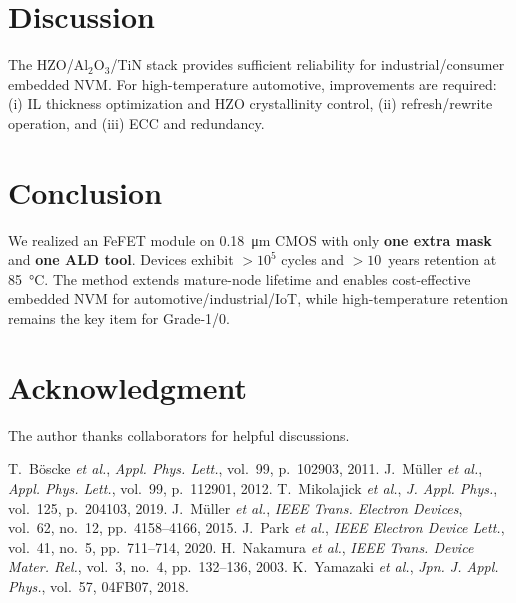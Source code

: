 \documentclass[conference]{IEEEtran}
\begin{document}

\section{Discussion}
The HZO/Al\(_2\)O\(_3\)/TiN stack provides sufficient reliability for industrial/consumer embedded NVM. For high-temperature automotive, improvements are required: (i) IL thickness optimization and HZO crystallinity control, (ii) refresh/rewrite operation, and (iii) ECC and redundancy.

\section{Conclusion}
We realized an FeFET module on \SI{0.18}{\micro m} CMOS with only \textbf{one extra mask} and \textbf{one ALD tool}. Devices exhibit \(>10^{5}\) cycles and \(>\!10\)~years retention at \SI{85}{\celsius}. The method extends mature-node lifetime and enables cost-effective embedded NVM for automotive/industrial/IoT, while high-temperature retention remains the key item for Grade-1/0.

\section*{Acknowledgment}
The author thanks collaborators for helpful discussions.


\begin{thebibliography}{99}
 T.~Böscke \emph{et al.}, \emph{Appl. Phys. Lett.}, vol.~99, p.~102903, 2011.
 J.~Müller \emph{et al.}, \emph{Appl. Phys. Lett.}, vol.~99, p.~112901, 2012.
 T.~Mikolajick \emph{et al.}, \emph{J. Appl. Phys.}, vol.~125, p.~204103, 2019.
 J.~Müller \emph{et al.}, \emph{IEEE Trans. Electron Devices}, vol.~62, no.~12, pp.~4158--4166, 2015.
 J.~Park \emph{et al.}, \emph{IEEE Electron Device Lett.}, vol.~41, no.~5, pp.~711--714, 2020.
 H.~Nakamura \emph{et al.}, \emph{IEEE Trans. Device Mater. Rel.}, vol.~3, no.~4, pp.~132--136, 2003.
 K.~Yamazaki \emph{et al.}, \emph{Jpn. J. Appl. Phys.}, vol.~57, 04FB07, 2018.
\end{thebibliography}
\end{document}

